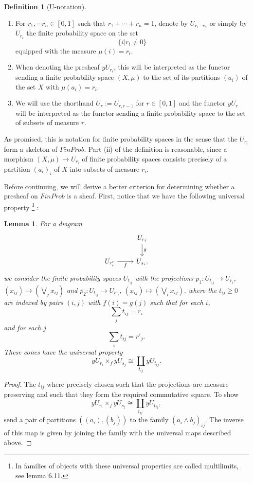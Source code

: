 \documentclass[a4paper]{amsproc}
\theoremstyle{plain}
\newtheorem{lemma}[theorem]{Lemma}
\theoremstyle{definition}
\newtheorem{definition}[theorem]{Definition}
\theoremstyle{remark}
\numberwithin{equation}{section}
\begin{document}
\begin{definition}[U-notation] \label{U-notation}
\begin{enumerate}
\item For $r_1, \cdots r_n \in [0,1]$ such that $r_1 + \cdots + r_n = 1$, denote by $U_{r_1 \cdots r_n}$ or simply by $U_{r_i}$ the finite probability space on the set 
\[
\{i | r_i \neq 0 \}
\]
equipped with the measure $\mu(i) = r_i$.
\item When denoting the presheaf $y U_{r_i}$, this will be interpreted as the functor sending a finite probability space $(X,\mu)$ to the set of its partitions $(a_i)$ of the set $X$ with $\mu(a_i) = r_i$.
\item We will use the shorthand $U_r := U_{r,r-1}$ for $r \in [0,1]$ and the functor $y U_r$ will be interpreted as the functor sending a finite probability space to the set of subsets of measure $r$.
\end{enumerate}
\end{definition}

As promised, this is notation for finite probability spaces in the sense that the $U_{r_i}$ form a skeleton of $FinProb$. Part (ii) of the definition is reasonable, since a morphism $(X,\mu) \to U_{r_i}$ of finite probability spaces consists precisely of a partition $(a_i)_i$ of $X$ into subsets of measure $r_i$.

Before continuing, we will derive a better criterion for determining whether a presheaf on $FinProb$ is a sheaf. First, notice that we have the following universal property \footnote{In \cite{caramello_lafforgue} families of objects with these universal properties are called multilimits, see lemma 6.11.} :

\begin{lemma} \label{multipullback}
For a diagram
\[
\begin{tikzcd}
& U_{r_i} \arrow[d, "g"] \\
U_{r'_i} \arrow[r, "f"'] & U_{s_i} ,
\end{tikzcd}
\]
we consider the finite probability spaces $U_{t_{ij}}$ with the projections $p_1: U_{t_{ij}} \to U_{r_i}$, $(x_{ij}) \mapsto (\bigvee_j x_{ij})$ and $p_2: U_{t_{ij}} \to U_{r'_i}$, $(x_{ij}) \mapsto (\bigvee_i x_{ij})$, where the $t_{ij} \geq 0$ are indexed by pairs $(i, j)$ with $f(i) = g(j)$ such that for each $i$,
\[
\sum_j t_{ij} = r_i
\]
and for each $j$
\[
\sum_i t_{ij} = r'_j .
\]
These cones have the universal property
\[
y U_{r_i} \times_f y U_{s_j} \cong \coprod_{t_{ij}} y U_{t_{ij}} .
\]
\end{lemma}
\begin{proof}
The $t_{ij}$ where precisely chosen such that the projections are measure preserving and such that they form the required commutative square. To show
\[
y U_{r_i} \times_f y U_{s_j} \cong \coprod_{t_{ij}} y U_{t_{ij}} ,
\]
send a pair of partitions $((a_i),(b_j))$ to the family $(a_i \wedge b_j)_{ij}$. The inverse of this map is given by joining the family with the universal maps described above.
\end{proof}
\end{document}
